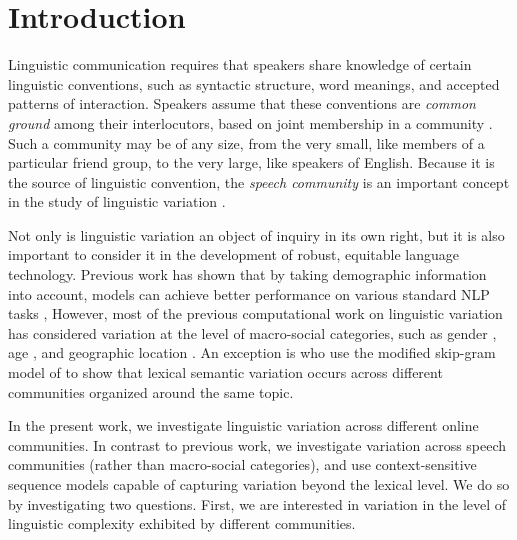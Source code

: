 \documentclass[11pt]{article}
\newcommand\jp[1]{\todo[backgroundcolor=blue!10]{JP: #1}}
\begin{document}
\section{Introduction}
Linguistic communication requires that speakers share
knowledge of certain linguistic conventions, such as syntactic
structure, word meanings, and accepted patterns of interaction.
Speakers assume that these conventions are \emph{common ground} among
their interlocutors, based on joint membership in a community
\cite{Stalnaker2002, Clark1996}.  Such a community may be of any size,
from the very small, like members of a particular friend group, to the
very large, like speakers of English.  Because it is the source of
linguistic convention, the \emph{speech community} is an important
concept in the study of linguistic variation \citep{Gumperz1972}.

Not only is linguistic variation an object of inquiry in its own
right, but it is also important to consider it in the development of
robust, equitable language technology.  Previous work has shown that
by taking demographic information into account, models can achieve
better performance on various standard NLP tasks
\citep{Hovy2015,Yang2017}, 
%
However, most of the previous computational work on linguistic variation 
has considered variation at the level of macro-social categories, such as gender
\citep{Burger2011,Ciot2013,Bamman2014}, age \citep{Nguyen2013}, and
geographic location \citep{Eisenstein2010,Bamman2014a}.
An exception is \citet{DelTredici2017} who use the modified
skip-gram model of \citet{Bamman2014a} to show that lexical semantic
variation occurs across different communities organized around the
same topic.

In the present work, we investigate linguistic variation
across different online communities. In contrast to previous work, we
investigate variation across speech communities (rather than
macro-social categories), and use context-sensitive sequence models
capable of capturing variation beyond the lexical level.
%
We do so by investigating two questions.  First, we are interested in
variation in the level of linguistic complexity exhibited by different
communities.
  
\end{document}
